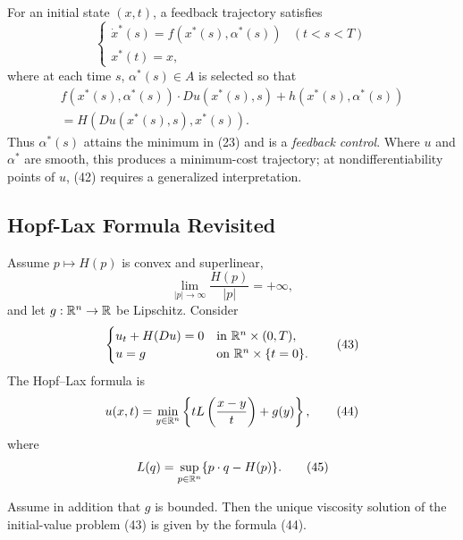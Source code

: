 \begin{remark}
\label{rem:design-of-optimal-controls}

For an initial state $(x,t)$, a feedback trajectory satisfies
\[
\begin{cases} \dot{x}^*(s) = f(x^*(s), \alpha^*(s)) & (t < s < T) \\ x^*(t) = x, \end{cases}
\tag{41}
\]
where at each time $s$, $\alpha^*(s) \in A$ is selected so that
\[
\begin{aligned}
f(x^*(s), \alpha^*(s)) \cdot Du(x^*(s), s) + h(x^*(s), \alpha^*(s)) \\
= H(Du(x^*(s), s), x^*(s)).
\end{aligned}
\tag{42}
\]
Thus $\alpha^*(s)$ attains the minimum in (23) and is a \textit{feedback control}. Where $u$ and $\alpha^*$ are smooth, this produces a minimum-cost trajectory; at nondifferentiability points of $u$, (42) requires a generalized interpretation.
\end{remark}

\subsection{Hopf-Lax Formula Revisited}

Assume $p\mapsto H(p)$ is convex and superlinear,
\[
\lim_{|p|\to\infty}\frac{H(p)}{|p|}=+\infty,
\]
and let $g:\mathbb{R}^n\to\mathbb{R}$ be Lipschitz. Consider
\[
\begin{cases}
u_t+H(Du)=0 & \text{in }\mathbb{R}^n\times(0,T),\\
u=g & \text{on }\mathbb{R}^n\times\{t=0\}.
\end{cases}
\tag{43}
\]
The Hopf--Lax formula is
\[
u(x,t)=\min_{y\in\mathbb{R}^n}\left\{tL\left(\frac{x-y}{t}\right)+g(y)\right\},
\tag{44}
\]
where
\[
L(q)=\sup_{p\in\mathbb{R}^n}\{p\cdot q-H(p)\}.
\tag{45}
\]

\begin{theorem}
\label{thm:hopf-lax-formula-viscosity-solution}

Assume in addition that $g$ is bounded. Then the unique viscosity solution of the initial-value problem (43) is given by the formula (44).
\end{theorem}

